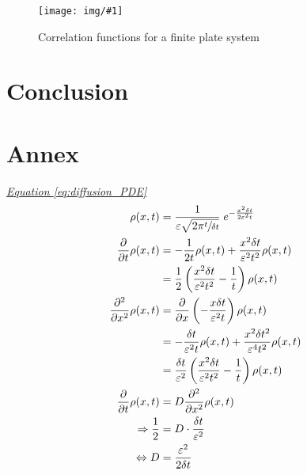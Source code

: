 \documentclass[a4paper, parskip=half]{scrartcl}
\newcommand{\myImage}[2]{
	\begin{figure}[H]
	\centering
	\texttt{[image: img/\#1]}
	\caption{#2}
	\label{pic:#1}
	\end{figure}
}
\newcommand{\myEqRef}[1]{\textit{\hyperref[eq:#1]{Equation \ref*{eq:#1}}}}
\begin{document}
\myImage{limited_correlation}{Correlation functions for a finite plate system}

\newpage
\section{Conclusion}


\newpage
\section{Annex}
\myEqRef{diffusion_PDE}
\begin{align}
\rho(x,t) &= \frac{1}{\varepsilon\sqrt{2\pi\sfrac{t}{\delta t}}}\; e^{-\frac{x^2 \delta t}{2 \varepsilon^2 t}} \\
\frac{\partial}{\partial t} \rho(x,t) &= - \frac{1}{2t} \rho(x,t) + \frac{x^2 \delta t}{\varepsilon^2t^2} \rho(x,t) \\
&= \frac{1}{2} \left(\frac{x^2 \delta t}{\varepsilon^2t^2} - \frac{1}{t} \right)\rho(x,t) \\
\frac{\partial^2}{\partial x^2} \rho(x,t) &= \frac{\partial}{\partial x} \left(-\frac{x\delta t}{\varepsilon^2t} \right) \rho(x,t) \\
&= -\frac{\delta t}{\varepsilon^2t} \rho(x,t) + \frac{x^2\delta t^2}{\varepsilon^4 t^2} \rho(x,t) \\
&= \frac{\delta t}{\varepsilon^2}\left(\frac{x^2 \delta t}{\varepsilon^2 t^2} - \frac{1}{t}\right) \rho(x,t) \\
\frac{\partial}{\partial t} \rho(x,t) &= D \frac{\partial^2}{\partial x^2 } \rho(x,t)\\
\Rightarrow \frac{1}{2} &= D \cdot \frac{\delta t}{\varepsilon^2}\\
\Leftrightarrow D &= \frac{\varepsilon^2}{2\delta t}
\end{align}
\end{document}

